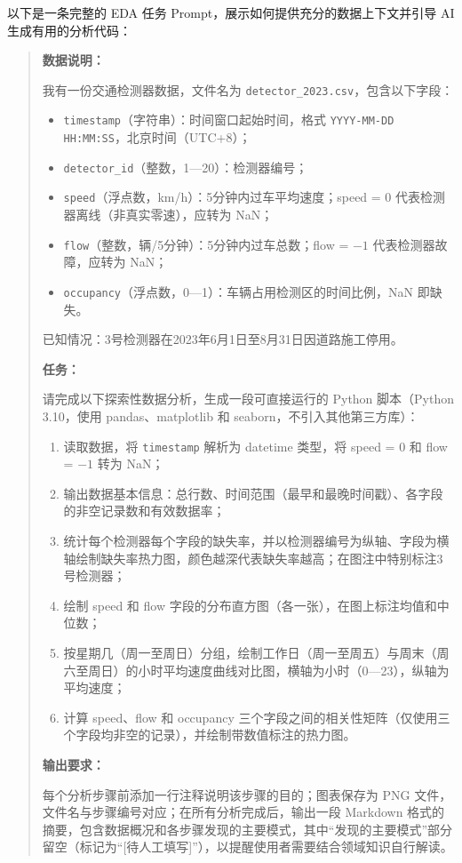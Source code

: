 以下是一条完整的 EDA 任务 Prompt，展示如何提供充分的数据上下文并引导 AI 生成有用的分析代码：

\begin{quote}
\textbf{数据说明：}

我有一份交通检测器数据，文件名为 \texttt{detector\_2023.csv}，包含以下字段：
\begin{itemize}
  \item \texttt{timestamp}（字符串）：时间窗口起始时间，格式 \texttt{YYYY-MM-DD HH:MM:SS}，北京时间（UTC+8）；
  \item \texttt{detector\_id}（整数，1—20）：检测器编号；
  \item \texttt{speed}（浮点数，km/h）：5分钟内过车平均速度；speed = 0 代表检测器离线（非真实零速），应转为 NaN；
  \item \texttt{flow}（整数，辆/5分钟）：5分钟内过车总数；flow = $-1$ 代表检测器故障，应转为 NaN；
  \item \texttt{occupancy}（浮点数，0—1）：车辆占用检测区的时间比例，NaN 即缺失。
\end{itemize}

已知情况：3号检测器在2023年6月1日至8月31日因道路施工停用。

\textbf{任务：}

请完成以下探索性数据分析，生成一段可直接运行的 Python 脚本（Python 3.10，使用 pandas、matplotlib 和 seaborn，不引入其他第三方库）：

\begin{enumerate}
  \item 读取数据，将 \texttt{timestamp} 解析为 datetime 类型，将 speed = 0 和 flow = $-1$ 转为 NaN；
  \item 输出数据基本信息：总行数、时间范围（最早和最晚时间戳）、各字段的非空记录数和有效数据率；
  \item 统计每个检测器每个字段的缺失率，并以检测器编号为纵轴、字段为横轴绘制缺失率热力图，颜色越深代表缺失率越高；在图注中特别标注3号检测器；
  \item 绘制 speed 和 flow 字段的分布直方图（各一张），在图上标注均值和中位数；
  \item 按星期几（周一至周日）分组，绘制工作日（周一至周五）与周末（周六至周日）的小时平均速度曲线对比图，横轴为小时（0—23），纵轴为平均速度；
  \item 计算 speed、flow 和 occupancy 三个字段之间的相关性矩阵（仅使用三个字段均非空的记录），并绘制带数值标注的热力图。
\end{enumerate}

\textbf{输出要求：}

每个分析步骤前添加一行注释说明该步骤的目的；图表保存为 PNG 文件，文件名与步骤编号对应；在所有分析完成后，输出一段 Markdown 格式的摘要，包含数据概况和各步骤发现的主要模式，其中“发现的主要模式”部分留空（标记为“[待人工填写]”），以提醒使用者需要结合领域知识自行解读。
\end{quote}

